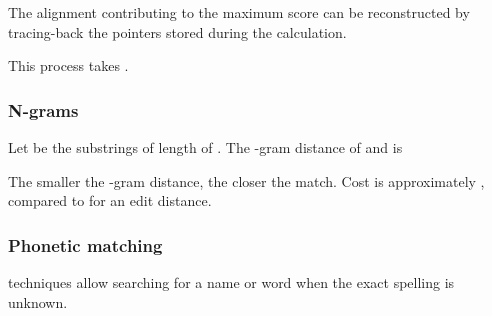 The alignment contributing to the maximum score can be reconstructed
by tracing-back the pointers stored during the calculation.

This process takes .

\subsubsection{N-grams}
Let  be the substrings of length  of . The -gram distance of  and  is

The smaller the -gram distance, the closer the match. Cost is
approximately , compared to  for an edit distance.

\subsubsection{Phonetic matching}
 techniques allow searching for a name or word when
the exact spelling is unknown.

